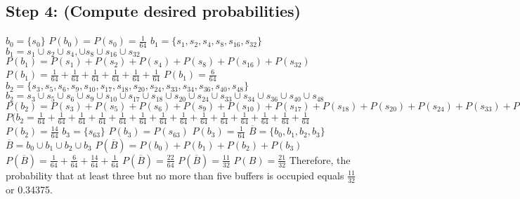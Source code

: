 \documentclass[a4paper,10pt]{article}
\begin{document}
\subsection{Step 4: (Compute desired probabilities)}
$ b_{0} = \{s_{0}\} $ \newline
$ P(b_{0}) = P(s_{0}) = \frac{1}{64} $ \newline
$ b_{1} = \{s_{1}, s_{2}, s_{4}, s_{8}, s_{16}, s_{32}\} $ \newline
$ b_{1} = s_{1} \cup s_{2} \cup s_{4}, \cup s_{8} \cup s_{16} \cup s_{32} $ \newline
$ P(b_{1}) = P(s_{1}) + P(s_{2}) + P(s_{4}) + P(s_{8}) + P(s_{16}) + P(s_{32}) $ \newline
$ P(b_{1}) = \frac{1}{64} + \frac{1}{64} + \frac{1}{64} + \frac{1}{64} + \frac{1}{64} + \frac{1}{64} $ \newline
$ P(b_{1}) = \frac{6}{64} $ \newline
$ b_{2} = \{s_{3}, s_{5}, s_{6}, s_{9}, s_{10}, s_{17}, s_{18}, s_{20}, s_{24}, s_{33}, s_{34}, s_{36}, s_{40}, 
s_{48}\} $ \newline
$ b_{2} = s_{3} \cup s_{5} \cup s_{6} \cup s_{9} \cup s_{10} \cup s_{17} \cup s_{18} \cup s_{20} \cup s_{24} \cup 
s_{33} \cup s_{34} \cup s_{36} \cup s_{40} \cup s_{48} $ \newline
$ P(b_{2}) = P(s_{3}) + P(s_{5}) + P(s_{6}) + P(s_{9}) + P(s_{10}) + P(s_{17}) + P(s_{18}) + P(s_{20}) + P(s_{24}) + 
P(s_{33}) + P(s_{34}) + P(s_{36}) + P(s_{40}) + P(s_{48}) $ \newline
$ P(b_{2} = \frac{1}{64} + \frac{1}{64} + \frac{1}{64} + \frac{1}{64} + \frac{1}{64} + \frac{1}{64} + \frac{1}{64} + 
\frac{1}{64} + \frac{1}{64} + \frac{1}{64} + \frac{1}{64} + \frac{1}{64} + \frac{1}{64} + \frac{1}{64} $ \newline
$ P(b_{2}) = \frac{14}{64} $ \newline
$ b_{3} = \{s_{63}\} $ \newline
$ P(b_{3}) = P(s_{63}) $ \newline
$ P(b_{3}) = \frac{1}{64} $ \newline
$ \overline{B} = \{b_{0}, b_{1}, b_{2}, b_{3}\} $ \newline
$ \overline{B} = b_{0} \cup b_{1} \cup b_{2} \cup b_{3} $ \newline
$ P(\overline{B}) = P(b_{0}) + P(b_{1}) + P(b_{2}) + P(b_{3}) $ \newline
$ P(\overline{B}) = \frac{1}{64} + \frac{6}{64} + \frac{14}{64} + \frac{1}{64} $ \newline
$ P(\overline{B}) = \frac{22}{64} $ \newline
$ P(\overline{B}) = \frac{11}{32} $ \newline
$ P(B) = \frac{21}{32} $ \newline 
Therefore, the probability that at least three but no more than five buffers is occupied equals $ \frac{11}{32} $ or 
0.34375.
\end{document}
